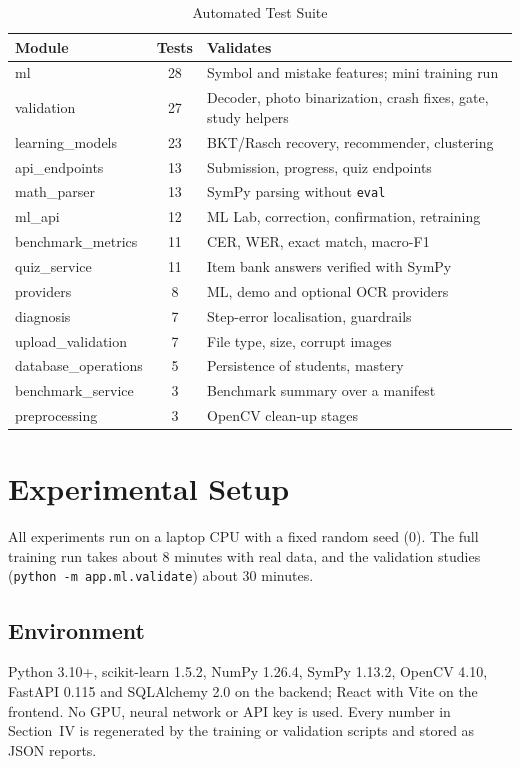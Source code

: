 \documentclass[conference]{IEEEtran}
\begin{document}
\begin{table}[!t]
\caption{Automated Test Suite}
\label{tab:tests}
\centering
\footnotesize
\begin{tabular}{L{2.9cm}cL{3.7cm}}
\toprule
Module & Tests & Validates\\
\midrule
ml & 28 & Symbol and mistake features; mini training run\\
validation & 27 & Decoder, photo binarization, crash fixes, gate, study helpers\\
learning\_models & 23 & BKT/Rasch recovery, recommender, clustering\\
api\_endpoints & 13 & Submission, progress, quiz endpoints\\
math\_parser & 13 & SymPy parsing without \texttt{eval}\\
ml\_api & 12 & ML Lab, correction, confirmation, retraining\\
benchmark\_metrics & 11 & CER, WER, exact match, macro-F1\\
quiz\_service & 11 & Item bank answers verified with SymPy\\
providers & 8 & ML, demo and optional OCR providers\\
diagnosis & 7 & Step-error localisation, guardrails\\
upload\_validation & 7 & File type, size, corrupt images\\
database\_operations & 5 & Persistence of students, mastery\\
benchmark\_service & 3 & Benchmark summary over a manifest\\
preprocessing & 3 & OpenCV clean-up stages\\
\bottomrule
\end{tabular}
\end{table}

\section{Experimental Setup}
All experiments run on a laptop CPU with a fixed random seed (0). The full training run takes about 8 minutes with real data, and the validation studies (\texttt{python -m app.ml.validate}) about 30 minutes.

\subsection{Environment}
Python 3.10+, scikit-learn 1.5.2, NumPy 1.26.4, SymPy 1.13.2, OpenCV 4.10, FastAPI 0.115 and SQLAlchemy 2.0 on the backend; React with Vite on the frontend. No GPU, neural network or API key is used. Every number in Section~IV is regenerated by the training or validation scripts and stored as JSON reports.
\end{document}
